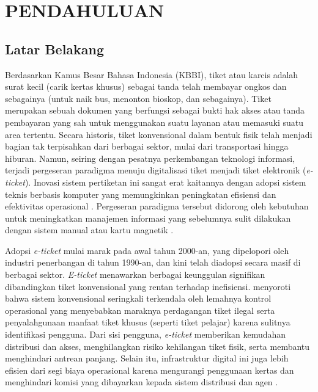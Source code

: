 \cleardoublepage %
\chapter{PENDAHULUAN}
\label{chap:pendahuluan}
\section{Latar Belakang}
Berdasarkan Kamus Besar Bahasa Indonesia (KBBI), tiket atau karcis adalah surat kecil (carik kertas khusus) sebagai tanda telah membayar ongkos dan sebagainya (untuk naik bus, menonton bioskop, dan sebagainya). Tiket merupakan sebuah dokumen yang berfungsi sebagai bukti hak akses atau tanda pembayaran yang sah untuk menggunakan suatu layanan atau memasuki suatu area tertentu. Secara historis, tiket konvensional dalam bentuk fisik telah menjadi bagian tak terpisahkan dari berbagai sektor, mulai dari transportasi hingga hiburan. Namun, seiring dengan pesatnya perkembangan teknologi informasi, terjadi pergeseran paradigma menuju digitalisasi tiket menjadi tiket elektronik (\textit{e-ticket}). Inovasi sistem pertiketan ini sangat erat kaitannya dengan adopsi sistem teknis berbasis komputer yang memungkinkan peningkatan efisiensi dan efektivitas operasional \cite{lubeck2012electronic}. Pergeseran paradigma tersebut didorong oleh kebutuhan untuk meningkatkan manajemen informasi yang sebelumnya sulit dilakukan dengan sistem manual atau kartu magnetik \cite{lubeck2012electronic}. 

Adopsi \textit{e-ticket} mulai marak pada awal tahun 2000-an, yang dipelopori oleh industri penerbangan di tahun 1990-an, dan kini telah diadopsi secara masif di berbagai sektor. \textit{E-ticket} menawarkan berbagai keunggulan signifikan dibandingkan tiket konvensional yang rentan terhadap inefisiensi. \textcite{lubeck2012electronic} menyoroti bahwa sistem konvensional seringkali terkendala oleh lemahnya kontrol operasional yang menyebabkan maraknya perdagangan tiket ilegal serta penyalahgunaan manfaat tiket khusus (seperti tiket pelajar) karena sulitnya identifikasi pengguna. Dari sisi pengguna, \textit{e-ticket} memberikan kemudahan distribusi dan akses, menghilangkan risiko kehilangan tiket fisik, serta membantu menghindari antrean panjang. Selain itu, infrastruktur digital ini juga lebih efisien dari segi biaya operasional karena mengurangi penggunaan kertas dan menghindari komisi yang dibayarkan kepada sistem distribusi dan agen \cite{chen2007passenger}.

